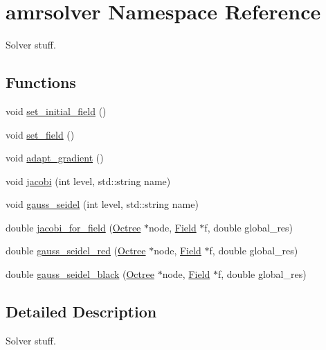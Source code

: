 \hypertarget{namespaceamrsolver}{}\section{amrsolver Namespace Reference}
\label{namespaceamrsolver}


Solver stuff.  


\subsection*{Functions}
\begin{DoxyCompactItemize}
\item 
void \hyperlink{namespaceamrsolver_a30270c7faf5dc4245839245162d2d763}{set\+\_\+initial\+\_\+field} ()
\item 
void \hyperlink{namespaceamrsolver_aa8ba0266fc376e4006289aa795fbe65f}{set\+\_\+field} ()
\item 
void \hyperlink{namespaceamrsolver_a9c93c4e4c5d010e8ac0ab4175f773053}{adapt\+\_\+gradient} ()
\item 
void \hyperlink{namespaceamrsolver_a0535b8cfa1042012c1c9225c3310c570}{jacobi} (int level, std\+::string name)
\item 
void \hyperlink{namespaceamrsolver_a54da11634e9a8621901164515143ec5b}{gauss\+\_\+seidel} (int level, std\+::string name)
\item 
double \hyperlink{namespaceamrsolver_a07e3068eaab7e7b70d1a22880f5e94f7}{jacobi\+\_\+for\+\_\+field} (\hyperlink{classmy_octree_1_1_octree}{Octree} $\ast$node, \hyperlink{classmy_octree_1_1_field}{Field} $\ast$f, double global\+\_\+res)
\item 
double \hyperlink{namespaceamrsolver_a9b68ac4fd5dffe436c5082657d70c158}{gauss\+\_\+seidel\+\_\+red} (\hyperlink{classmy_octree_1_1_octree}{Octree} $\ast$node, \hyperlink{classmy_octree_1_1_field}{Field} $\ast$f, double global\+\_\+res)
\item 
double \hyperlink{namespaceamrsolver_af5a5bde6823f819161702891b9b1669b}{gauss\+\_\+seidel\+\_\+black} (\hyperlink{classmy_octree_1_1_octree}{Octree} $\ast$node, \hyperlink{classmy_octree_1_1_field}{Field} $\ast$f, double global\+\_\+res)
\end{DoxyCompactItemize}


\subsection{Detailed Description}
Solver stuff. 

